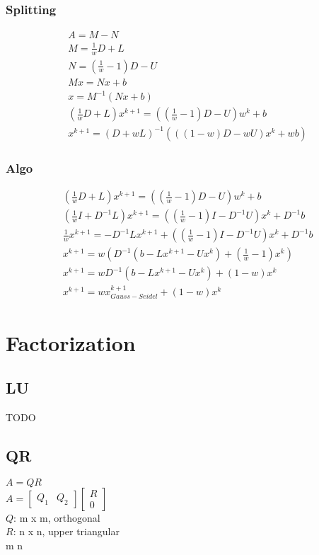\documentclass[8pt,letter]{article}
\begin{document}
\begin{multicols*}{2}
    \subsubsection{Splitting}
    \begin{align*}
      & A = M - N\\
      & M = \frac{1}{w} D + L\\
      & N = (\frac{1}{w} - 1)D - U\\
      & Mx = Nx + b\\
      & x = M^{-1}(Nx + b)\\
      & (\frac{1}{w} D + L)x^{k+1} = ((\frac{1}{w}-1) D - U) w^k +b\\
      & x^{k+1} = (D+wL)^{-1} (((1-w)D - wU)x^k + wb)
    \end{align*}

    \subsubsection{Algo}
    \begin{align*}
      & (\frac{1}{w} D + L)x^{k+1} = ((\frac{1}{w}-1) D - U) w^k +b\\
      & (\frac{1}{w}I + D^{-1}L)x^{k+1} = ((\frac{1}{w} - 1)I - D^{-1}U)x^k + D^{-1}b\\
      & \frac{1}{w}x^{k+1} = -D^{-1}L x^{k+1} + ((\frac{1}{w} - 1)I - D^{-1}U)x^k + D^{-1}b\\
      & x^{k+1} = w(D^{-1}(b-Lx^{k+1}-Ux^k)+(\frac{1}{w}-1)x^k)\\
      & x^{k+1} = wD^{-1}(b-Lx^{k+1}-Ux^k)+(1-w)x^k\\
      & x^{k+1} = w x^{k+1}_{Gauss-Seidel} + (1-w)x^k
    \end{align*}
    
    \vfill\null
    \pagebreak
    
    \section{Factorization}
    
    \subsection{LU}
    TODO

    \vfill\null
    \columnbreak
    
    \subsection{QR}
    $A = QR$\\
    $A = \begin{bmatrix} Q_1 &Q_2 \end{bmatrix} \begin{bmatrix} R\\0 \end{bmatrix}$\\
    $Q$: m x m, orthogonal\\
    $R$: n x n, upper triangular\\
    m \geq n\\


\end{multicols*}
\end{document}
